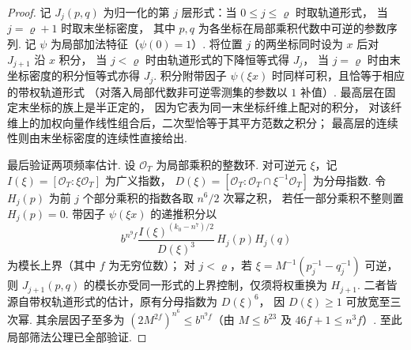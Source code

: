 \begin{proof}
记 $J_j(p,q)$ 为归一化的第 $j$ 层形式：当 $0\le j\le\varrho$ 时取轨道形式，
当 $j=\varrho+1$ 时取末坐标密度，
其中 $p,q$ 为各坐标在局部乘积代数中可逆的参数序列.
记 $\psi$ 为局部加法特征（$\psi(0)=1$）.
将位置 $j$ 的两坐标同时设为 $x$ 后对 $J_{j+1}$ 沿 $x$ 积分，
当 $j<\varrho$ 时由轨道形式的下降恒等式得 $J_j$，
当 $j=\varrho$ 时由末坐标密度的积分恒等式亦得 $J_j$.
积分附带因子 $\psi(\xi x)$ 时同样可积，且恰等于相应的带权轨道形式
（对落入局部代数非可逆零测集的参数以 $1$ 补值）.
最高层在固定末坐标的族上是半正定的，
因为它表为同一末坐标纤维上配对的积分，
对该纤维上的加权向量作线性组合后，二次型恰等于其平方范数之积分；
最高层的连续性则由末坐标密度的连续性直接给出.

最后验证两项频率估计. 设 $\mathcal O_T$ 为局部乘积的整数环.
对可逆元 $\xi$，记 $I(\xi)=[\mathcal O_T:\xi\mathcal O_T]$ 为广义指数，
$D(\xi)=[\mathcal O_T:\mathcal O_T\cap\xi^{-1}\mathcal O_T]$ 为分母指数.
令 $H_j(p)$ 为前 $j$ 个部分乘积的指数各取 $n^6/2$ 次幂之积，
若任一部分乘积不整则置 $H_j(p)=0$.
带因子 $\psi(\xi x)$ 的递推积分以
\[
 b^{n^9 f}\frac{I(\xi)^{(k_0-n^7)/2}}{D(\xi)^3}\,
     H_j(p)H_j(q)
\]
为模长上界（其中 $f$ 为无穷位数）；
对 $j<\varrho$，若 $\xi=M^{-1}(p_j^{-1}-q_j^{-1})$ 可逆，
则 $J_{j+1}(p,q)$ 的模长亦受同一形式的上界控制，仅须将权重换为 $H_{j+1}$.
二者皆源自带权轨道形式的估计，原有分母指数为 $D(\xi)^6$，
因 $D(\xi)\ge1$ 可放宽至三次幂.
其余层因子至多为
$(2M^{2f})^{n^6}\le b^{n^9f}$（由 $M\le b^{23}$ 及 $46f+1\le n^3f$）.
至此局部筛法公理已全部验证.
\end{proof}

